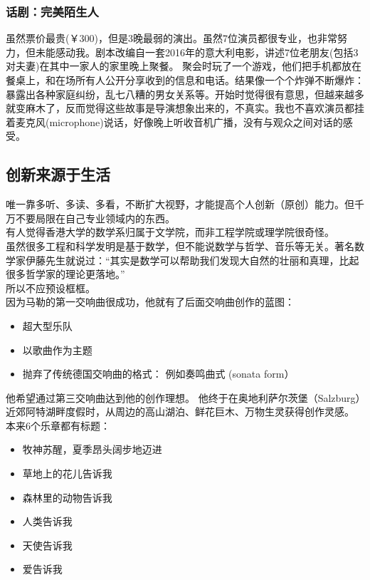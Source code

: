 \hypertarget{ux8bddux5267ux5b8cux7f8eux964cux751fux4eba}{%
\subsubsection{话剧：完美陌生人}\label{ux8bddux5267ux5b8cux7f8eux964cux751fux4eba}}

虽然票价最贵(￥300)，但是3晚最弱的演出。虽然7位演员都很专业，也非常努力，但未能感动我。剧本改编自一套2016年的意大利电影，讲述7位老朋友(包括3对夫妻)在其中一家人的家里晚上聚餐。
聚会时玩了一个游戏，他们把手机都放在餐桌上，和在场所有人公开分享收到的信息和电话。结果像一个个炸弹不断爆炸：暴露出各种家庭纠纷，乱七八糟的男女关系等。开始时觉得很有意思，但越来越多就变麻木了，反而觉得这些故事是导演想象出来的，不真实。我也不喜欢演员都挂着麦克风(microphone)说话，好像晚上听收音机广播，没有与观众之间对话的感受。

\hypertarget{ux521bux65b0ux6765ux6e90ux4e8eux751fux6d3b}{%
\subsection{创新来源于生活}\label{ux521bux65b0ux6765ux6e90ux4e8eux751fux6d3b}}

唯一靠多听、多读、多看，不断扩大视野，才能提高个人创新（原创）能力。但千万不要局限在自己专业领域内的东西。\\
有人觉得香港大学的数学系归属于文学院，而非工程学院或理学院很奇怪。\\
虽然很多工程和科学发明是基于数学，但不能说数学与哲学、音乐等无关。著名数学家伊藤先生就说过：``其实是数学可以帮助我们发现大自然的壮丽和真理，比起很多哲学家的理论更落地。''\\
所以不应预设框框。\\
因为马勒的第一交响曲很成功，他就有了后面交响曲创作的蓝图：

\begin{itemize}
\tightlist
\item
  超大型乐队
\item
  以歌曲作为主题
\item
  抛弃了传统德国交响曲的格式： 例如奏鸣曲式 (sonata form）\\
\end{itemize}

他希望通过第三交响曲达到他的创作理想。
他终于在奥地利萨尔茨堡（Salzburg）近郊阿特湖畔度假时，从周边的高山湖泊、鲜花巨木、万物生灵获得创作灵感。\\
本来6个乐章都有标题：

\begin{itemize}
\tightlist
\item
  牧神苏醒，夏季昂头阔步地迈进
\item
  草地上的花儿告诉我
\item
  森林里的动物告诉我
\item
  人类告诉我
\item
  天使告诉我
\item
  爱告诉我\\
\end{itemize}

